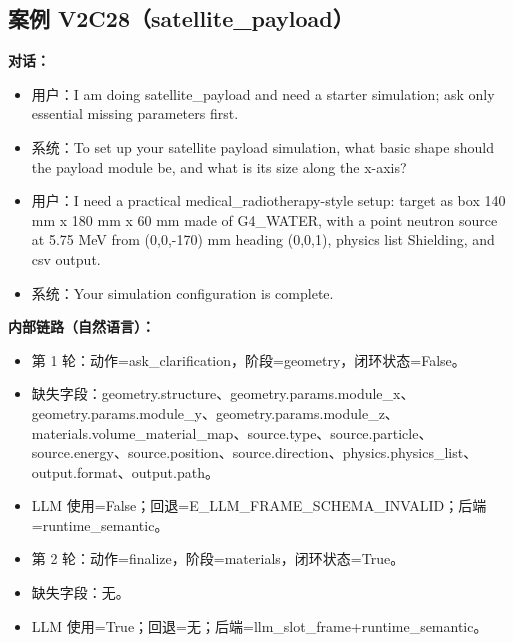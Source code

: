 \documentclass[11pt]{ctexart}
\begin{document}
\subsection{案例 V2C28（satellite\_payload）}
\textbf{对话：}
\begin{itemize}
\item 用户：I am doing satellite\_payload and need a starter simulation; ask only essential missing parameters first.
\item 系统：To set up your satellite payload simulation, what basic shape should the payload module be, and what is its size along the x-axis?
\item 用户：I need a practical medical\_radiotherapy-style setup: target as box 140 mm x 180 mm x 60 mm made of G4\_WATER, with a point neutron source at 5.75 MeV from (0,0,-170) mm heading (0,0,1), physics list Shielding, and csv output.
\item 系统：Your simulation configuration is complete.
\end{itemize}
\textbf{内部链路（自然语言）：}
\begin{itemize}
\item 第 1 轮：动作=ask\_clarification，阶段=geometry，闭环状态=False。
\item 缺失字段：geometry.structure、geometry.params.module\_x、geometry.params.module\_y、geometry.params.module\_z、materials.volume\_material\_map、source.type、source.particle、source.energy、source.position、source.direction、physics.physics\_list、output.format、output.path。
\item LLM 使用=False；回退=E\_LLM\_FRAME\_SCHEMA\_INVALID；后端=runtime\_semantic。
\item 第 2 轮：动作=finalize，阶段=materials，闭环状态=True。
\item 缺失字段：无。
\item LLM 使用=True；回退=无；后端=llm\_slot\_frame+runtime\_semantic。
\end{itemize}
\end{document}
